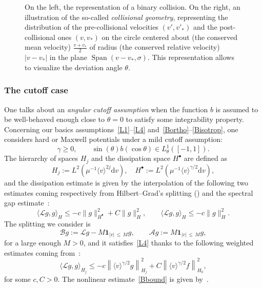 \documentclass[10pt]{amsart}
\theoremstyle{definition}\newtheorem{defi}[theo]{Definition}\newtheorem{rema}[theo]{Remark}\newtheorem{exam}[theo]{Example}\newtheorem{exem}[theo]{Example}\newtheorem{nota}[theo]{Notation}
\DeclareMathOperator{\Span}{Span}
\renewcommand{\d}{\mathrm{d}}
\newcommand{\Burin}{\mathbf{1}}
\renewcommand{\AA}{\mathcal{A}}
\newcommand{\BB}{\mathcal{B}}
\newcommand{\LL}{\mathcal{L}}
\newcommand{\Ss}{H}
\newcommand{\Ssp}{H^{\bullet}}
\renewcommand*\le{\leqslant}
\renewcommand*\ge{\geqslant}
\newcommand{\la}{\langle}
\newcommand{\ra}{\rangle}
\begin{document}
\begin{figure}[h]
\caption{On the left, the representation of a binary collision. On the right, an illustration of the so-called \emph{collisional geometry}, representing the distribution of the pre-collisional velocities $(v', v'_*)$ and the post-collisional ones $(v, v_*)$ on the circle centered about (the conserved mean velocity) $\frac{v + v_*}{2}$ of radius (the conserved relative velocity) $|v-v_*|$ in the plane $\Span(v-v_*, \sigma)$. This representation allows to visualize the deviation angle $\theta$.}
\end{figure}

\subsubsection{The cutoff case}

One talks about an \emph{angular cutoff assumption} when the function $b$ is assumed to be well-behaved enough close to $\theta = 0$ to satisfy some integrability property. Concerning our basics assumptions~\eqref{L1}--\eqref{L4} and~\eqref{Bortho}--\eqref{Bisotrop}, one considers hard or Maxwell potentials under a mild cutoff assumption:
\[
\gamma \ge 0, \qquad \sin(\theta) b(\cos \theta) \in L^1_\theta\left([-1, 1] \right).
\]
The hierarchy of spaces $\Ss_j$ and the dissipation space $\Ssp$ are defined as
\[
\Ss_j := L^2\left(\mu^{-1} \la v \ra^{2j} \d v \right), \quad \Ssp := L^2\left(\mu^{-1} \la v \ra^{\gamma/2} \d v\right),
\]
and the dissipation estimate is given by the interpolation of the following two estimates coming respectively from Hilbert--Grad's splitting (\cite{G1963,H1912}) and the spectral gap estimate~\cite[Theorem~1.1]{BM2005}:
\[
\la \LL g, g \ra_\Ss \le - c \| g \|^2_{\Ssp} + C \| g \|_{\Ss}^2, \qquad \la \LL g, g \ra_\Ss \le - c \| g \|^2_{\Ss}.
\]
The splitting we consider is
\[
\BB g := \LL g- M \Burin_{| v |\,\le\,M} g, \qquad \AA g := M \Burin_{| v |\,\le\,M} g,
\]
for a large enough $M > 0$, and it satisfies~\ref{L4} thanks to the following weighted estimates coming from~\cite[Proof of Lemma~3.3 for $\beta = 0$]{G2006}:
\[
\la \LL g, g \ra_{\Ss_j} \le - c \left\| \la v \ra^{\gamma/2} g \right\|^2_{\Ss_j} + C \left\| \la v \ra^{\gamma / 2} f \right\|_{\Ss_0}^2,
\]
for some $c, C > 0$. The nonlinear estimate~\ref{Bbound} is given by~\cite[Lemma~4.1]{G2004}.
\end{document}
